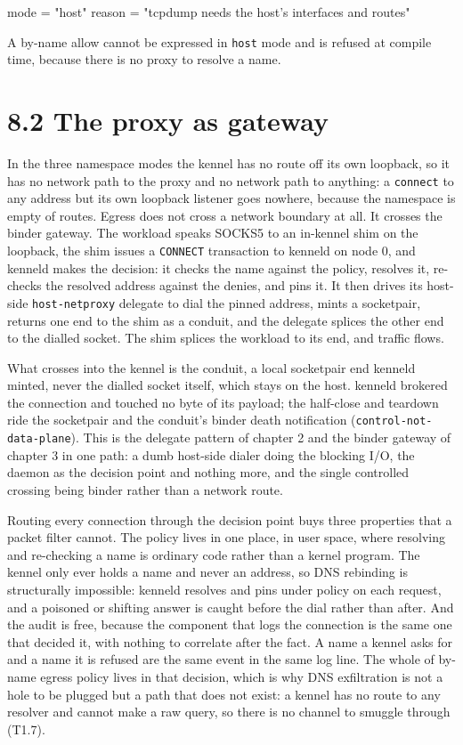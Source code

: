 \begin{kennelcode}
[net]
mode   = "host"
reason = "tcpdump needs the host's interfaces and routes"
\end{kennelcode}

A by-name allow cannot be expressed in \texttt{host} mode and is refused
at compile time, because there is no proxy to resolve a name.

\hypertarget{the-proxy-as-gateway}{%
\section{8.2 The proxy as gateway}\label{the-proxy-as-gateway}}

In the three namespace modes the kennel has no route off its own
loopback, so it has no network path to the proxy and no network path to
anything: a \texttt{connect} to any address but its own loopback
listener goes nowhere, because the namespace is empty of routes. Egress
does not cross a network boundary at all. It crosses the binder gateway.
The workload speaks SOCKS5 to an in-kennel shim on the loopback, the
shim issues a \texttt{CONNECT} transaction to kenneld on node 0, and
kenneld makes the decision: it checks the name against the policy,
resolves it, re-checks the resolved address against the denies, and pins
it. It then drives its host-side \texttt{host-netproxy} delegate to dial
the pinned address, mints a socketpair, returns one end to the shim as a
conduit, and the delegate splices the other end to the dialled socket.
The shim splices the workload to its end, and traffic flows.

What crosses into the kennel is the conduit, a local socketpair end
kenneld minted, never the dialled socket itself, which stays on the
host. kenneld brokered the connection and touched no byte of its
payload; the half-close and teardown ride the socketpair and the
conduit's binder death notification (\texttt{control-not-data-plane}).
This is the delegate pattern of chapter 2 and the binder gateway of
chapter 3 in one path: a dumb host-side dialer doing the blocking I/O,
the daemon as the decision point and nothing more, and the single
controlled crossing being binder rather than a network route.

Routing every connection through the decision point buys three
properties that a packet filter cannot. The policy lives in one place,
in user space, where resolving and re-checking a name is ordinary code
rather than a kernel program. The kennel only ever holds a name and
never an address, so DNS rebinding is structurally impossible: kenneld
resolves and pins under policy on each request, and a poisoned or
shifting answer is caught before the dial rather than after. And the
audit is free, because the component that logs the connection is the
same one that decided it, with nothing to correlate after the fact. A
name a kennel asks for and a name it is refused are the same event in
the same log line. The whole of by-name egress policy lives in that
decision, which is why DNS exfiltration is not a hole to be plugged but
a path that does not exist: a kennel has no route to any resolver and
cannot make a raw query, so there is no channel to smuggle through
(T1.7).

